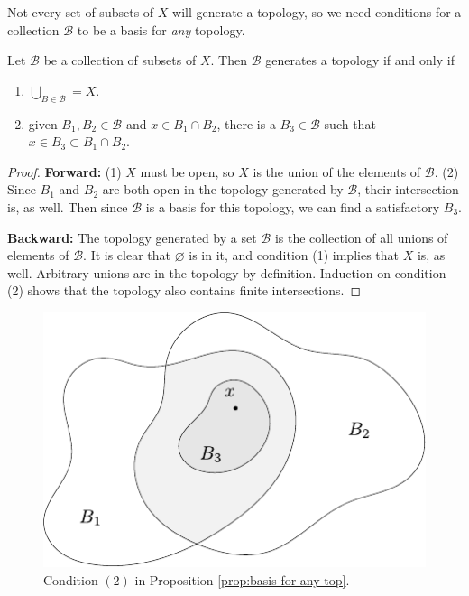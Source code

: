 \documentclass[10pt]{report}
\begin{document}
Not every set of subsets of $X$ will generate a topology, so we need conditions for a collection $\mathcal{B}$ to be a basis for \textit{any} topology.

\begin{prop}
\label{prop:basis-for-any-top}
Let $\mathcal{B}$ be a collection of subsets of $X$. Then $\mathcal{B}$ generates a topology if and only if
\begin{enumerate}
	\item $\bigcup_{B \in \mathcal{B}}=X$.
	\item given $B_1,B_2 \in \mathcal{B}$ and $x \in B_1 \cap B_2$, there is a $B_3 \in \mathcal{B}$ such that $x \in B_3 \subset B_1 \cap B_2$.
\end{enumerate}
\end{prop}
\begin{proof}
	\textbf{Forward:} (1) $X$ must be open, so $X$ is the union of the elements of $\mathcal{B}$. (2) Since $B_1$ and $B_2$ are both open in the topology generated by $\mathcal{B}$, their intersection is, as well. Then since $\mathcal{B}$ is a basis for this topology, we can find a satisfactory $B_3$.

	\textbf{Backward:} The topology generated by a set $\mathcal{B}$ is the collection of all unions of elements of $\mathcal{B}$. It is clear that $\varnothing$ is in it, and condition (1) implies that $X$ is, as well. Arbitrary unions are in the topology by definition. Induction on condition (2) shows that the topology also contains finite intersections.
\end{proof}

\begin{figure}[H]
	\centering
	\includegraphics[scale=1]{fig/basis.pdf}
	\caption{Condition $(2)$ in Proposition \ref{prop:basis-for-any-top}.}
\end{figure}
\end{document}
